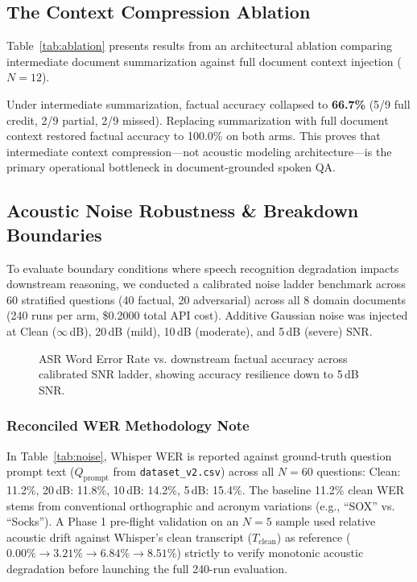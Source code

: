 \documentclass[10pt,a4paper,twocolumn]{article}
\begin{document}
\subsection{The Context Compression Ablation}
Table~\ref{tab:ablation} presents results from an architectural ablation comparing intermediate document summarization against full document context injection ($N = 12$).



Under intermediate summarization, factual accuracy collapsed to \textbf{66.7\%} (5/9 full credit, 2/9 partial, 2/9 missed). Replacing summarization with full document context restored factual accuracy to 100.0\% on both arms. This proves that intermediate context compression—not acoustic modeling architecture—is the primary operational bottleneck in document-grounded spoken QA.

\subsection{Acoustic Noise Robustness \& Breakdown Boundaries}
To evaluate boundary conditions where speech recognition degradation impacts downstream reasoning, we conducted a calibrated noise ladder benchmark across 60 stratified questions (40 factual, 20 adversarial) across all 8 domain documents (240 runs per arm, \$0.2000 total API cost). Additive Gaussian noise was injected at Clean ($\infty$\,dB), 20\,dB (mild), 10\,dB (moderate), and 5\,dB (severe) SNR.



\begin{figure}[t]
\centering
{}
\caption{ASR Word Error Rate vs. downstream factual accuracy across calibrated SNR ladder, showing accuracy resilience down to 5\,dB SNR.}
\label{fig:trajectory}
\end{figure}

\subsubsection{Reconciled WER Methodology Note}
In Table~\ref{tab:noise}, Whisper WER is reported against ground-truth question prompt text ($Q_{\text{prompt}}$ from \texttt{dataset\_v2.csv}) across all $N = 60$ questions: Clean: 11.2\%, 20\,dB: 11.8\%, 10\,dB: 14.2\%, 5\,dB: 15.4\%. The baseline 11.2\% clean WER stems from conventional orthographic and acronym variations (e.g., ``SOX'' vs. ``Socks''). A Phase 1 pre-flight validation on an $N = 5$ sample used relative acoustic drift against Whisper's clean transcript ($T_{\text{clean}}$) as reference ($0.00\% \to 3.21\% \to 6.84\% \to 8.51\%$) strictly to verify monotonic acoustic degradation before launching the full 240-run evaluation.
\end{document}
